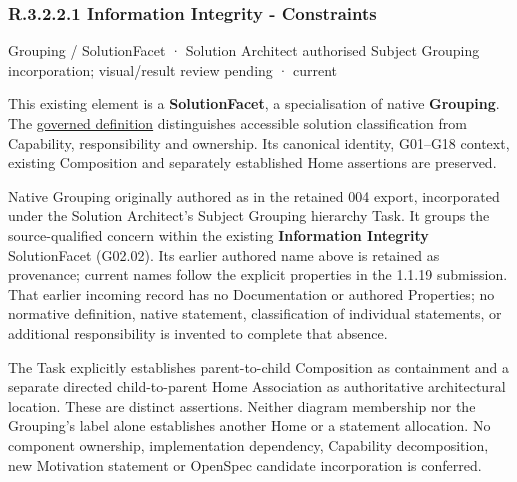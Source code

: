 \subsubsection*{R.3.2.2.1 Information Integrity - Constraints}
\label{navigation:R.3.2.2.1}

\label{element:80aa94b4210047a0a14563f408da1694}
{\small Grouping / SolutionFacet · Solution Architect authorised Subject Grouping incorporation; visual/result review pending · current}\par

This existing element is a \textbf{SolutionFacet}, a specialisation of native
\textbf{Grouping}. The \href{\detokenize{../../../../../../../governance/continuum-representation.md#solutionfacet-classification--1119-candidate}}{governed definition}
distinguishes accessible solution classification from Capability, responsibility
and ownership. Its canonical identity, G01–G18 context, existing Composition
and separately established Home assertions are preserved.



Native Grouping originally authored as \texttt{} in the retained 004 export,
incorporated under the Solution Architect's Subject Grouping hierarchy Task.
It groups the source-qualified \texttt{} concern within
the existing \textbf{Information Integrity} SolutionFacet (G02.02). Its earlier authored name above is retained as provenance; current names
follow the explicit properties in the 1.1.19 submission.
That earlier incoming record has no Documentation or authored Properties; no normative
definition, native statement, classification of individual statements, or
additional responsibility is invented to complete that absence.



The Task explicitly establishes parent-to-child Composition as containment and
a separate directed child-to-parent Home Association as authoritative architectural
location. These are distinct assertions. Neither diagram membership nor the
Grouping's label alone establishes another Home or a statement allocation.
No component ownership, implementation dependency, Capability decomposition,
new Motivation statement or OpenSpec candidate incorporation is conferred.




